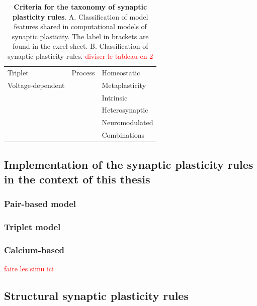 \begin{table}[h!]
{\begin{tabular}{|l||l||l|}
    Triplet     & Process & Homeostatic \\
    Voltage-dependent &  & Metaplasticity \\
    & & Intrinsic \\
    & & Heterosynaptic \\
    & & Neuromodulated\\
    & & Combinations \\
    \hline
\end{tabular}
}
    \caption{\textbf{Criteria for the taxonomy of synaptic plasticity rules}. A. Classification of model features shared in computational models of synaptic plasticity. The label in brackets are found in the excel sheet. B. Classification of synaptic plasticity rules.  \textcolor{red}{diviser le tableau en 2}}
    \label{tab:Review_features}
\end{table}



\subsection{Implementation of the synaptic plasticity rules in the context of this thesis}
\subsubsection{Pair-based model}

\subsubsection{Triplet model}

\subsubsection{Calcium-based}

\textcolor{red}{faire les simu ici }


\subsection{Structural synaptic plasticity rules}



\newpage



%
%
